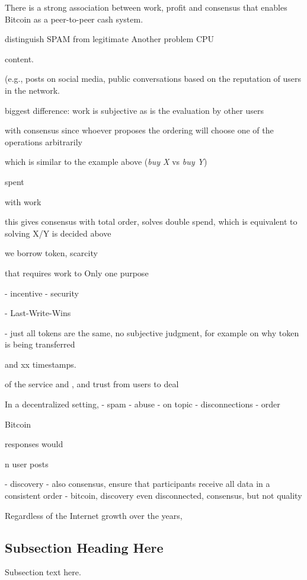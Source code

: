 \documentclass[10pt,journal,compsoc]{IEEEtran}
\begin{document}
There is a strong association between work, profit and consensus that enables
Bitcoin as a peer-to-peer cash system.

distinguish SPAM from legitimate
Another problem CPU



content.



 (e.g., posts on social media, public conversations
based on the reputation of users
in the network.


biggest difference:
work is subjective as is the evaluation by other users


 with consensus since
whoever proposes the ordering will choose one of the operations arbitrarily


 which is similar to the
example above (\emph{buy X} vs \emph{buy Y})

spent

with work



this gives consensus with total order, solves double spend, which is equivalent
to solving X/Y is decided above

we borrow token, scarcity


 that requires work to 
Only one purpose


- incentive
- security

- Last-Write-Wins

- just all tokens are the same, no subjective judgment, for example on why token is being transferred


 and xx timestamps.


 of the service and , and trust from users to deal

In a decentralized setting, 
    - spam
    - abuse
    - on topic
    - disconnections
    - order

Bitcoin

responses would




n user posts 

- discovery
- also consensus, ensure that participants receive all data in a consistent order
- bitcoin, discovery even disconnected, consensus, but not quality


Regardless of the Internet growth over the years,

\subsection{Subsection Heading Here}
Subsection text here.
\end{document}
